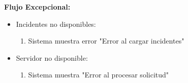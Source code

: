 \begin{multicols}{2}
\textbf{Flujo Excepcional:}
\begin{itemize}
    \item Incidentes no disponibles:
    \begin{enumerate}
        \item Sistema muestra error "Error al cargar incidentes"
    \end{enumerate}
    \item Servidor no disponible:
    \begin{enumerate}
        \item Sistema muestra "Error al procesar solicitud"
    \end{enumerate}
\end{itemize}

\end{multicols}